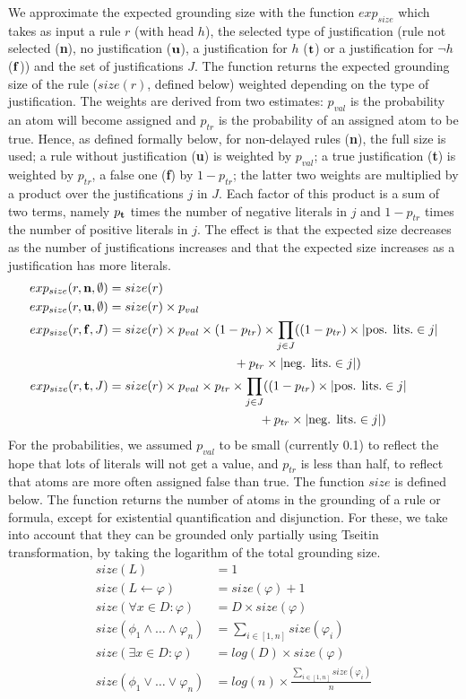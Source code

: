 \documentclass[11pt]{article}
\newcommand{\m}[1]{\ensuremath{#1}\xspace}
\newcommand{\trval}[1]{\m{{\bf #1}}}
\newcommand{\lrule}{\m{\leftarrow}}
\newcommand{\ltrue}{\trval{t}}
\newcommand{\lfalse}{\trval{f}}
\newcommand{\lunkn}{\trval{u}}
\newcommand{\f}{\m{\varphi}}
\newcommand{\typed}[2]{\m{#1\in #2:}}
\theoremstyle{plain}
\theoremstyle{definition}
\theoremstyle{example_basic}
\theoremstyle{example_contd}
\theoremstyle{plain}
\newcommand{\tbf}[1]{\textbf{#1}}
\newcommand{\change}[1]{#1}
\begin{document}
We approximate the expected grounding size with the function
$exp_{size}$ which takes as input a rule $r$ \change{(with head $h$)},
the selected type of justification (rule not selected (\tbf{n}), no
justification (\lunkn), \change{a justification for $h$ (\ltrue) or a
justification for $\lnot h$ (\lfalse))} and the set of justifications
$J$. \change{The function returns the expected grounding size of the
  rule ($size(r)$, defined below) weighted depending on the type of
  justification. The weights are derived from two estimates: $p_{val}$
  is the probability an atom will become assigned and $p_{tr}$ is the
  probability of an assigned atom to be true. Hence, as defined
  formally below, for non-delayed rules (\tbf{n}), the full size is
  used; a rule without justification (\tbf{u}) is weighted by
  $p_{val}$; a true justification (\tbf{t}) is weighted by $p_{tr}$, a
  false one (\tbf{f}) by $1-p_{tr}$; the latter two weights are
  multiplied by a product over the justifications $j$ in $J$. Each factor
  of this product is a sum of two terms, namely $p_{\ltrue}$ times the
  number of negative literals in $j$  and $1-p_{tr}$ times the number
  of positive literals in $j$. The effect is that the
  expected size decreases as the number of justifications increases
  and that the expected size increases as a justification has more
  literals. 
\begin{align*}
exp_{size}(r,\tbf{n},\emptyset) &= size(r)\\
exp_{size}(r,\lunkn,\emptyset) &= size(r)\times p_{val} \\
exp_{size}(r,\lfalse,J) &= size(r)\times p_{val} \times (1-p_{tr}) \times \prod_{j \in J} ((1-p_{tr}) \times | \text{pos. lits.}\in j| \\
&\qquad\qquad\qquad\qquad\qquad+ p_{tr} \times |\text{neg. lits.} \in j|) \\ 
exp_{size}(r,\ltrue,J) &= size(r) \times p_{val} \times p_{tr} \times \prod_{j \in J} ((1-p_{tr}) \times | \text{pos. lits.}\in j| \\
&\qquad\qquad\qquad\qquad\qquad\qquad+ p_{tr} \times |\text{neg. lits.} \in j|)
\end{align*}
For the probabilities, we assumed $p_{val}$ to be small (currently 0.1) to reflect the hope that lots of literals will not get a value, and $p_{tr}$ is less than half, to reflect that atoms are more often assigned false than true.}
\change{The function $size$ is defined below. The function returns the number of atoms in the grounding of a rule or formula, except for existential quantification and disjunction. For these, we take into account that they can be grounded only partially using Tseitin transformation, by taking the logarithm of the total grounding size.
\begin{align*}
size(L)&=1 \\
size(L \lrule \f)&=size(\f)+1 \\
size(\forall \typed{x}{D} \f)&=D\times size(\f) \\
size(\phi_1 \land \ldots \land \f_n)&=\sum_{i \in [1,n]}size(\f_i) \\ 
size(\exists \typed{x}{D} \f)&=log(D)\times size(\f) \\
size(\phi_1 \lor \ldots \lor \f_n)&=log(n)\times\frac{\sum_{i \in [1,n]}size(\f_i)}{n}
\end{align*}}
\end{document}

